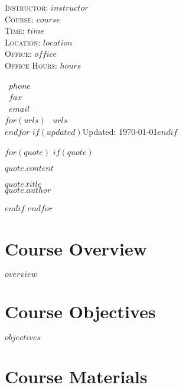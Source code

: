 \documentclass[$fontsize$, letterpaper]{article}
\begin{document}

\begin{minipage}[t]{2.95in}
 \flushleft \footnotesize \textsc{Instructor:} $instructor$\\ \textsc{Course:}
 $course$\\ \textsc{Time:} $time$\\ \textsc{Location:} $location$\\
 \textsc{Office:} $office$\\ \textsc{Office Hours:} $hours$
\end{minipage}
\hfill
\hfill
\begin{minipage}[t]{1.7in}
  \flushright \footnotesize {} ~$phone$\\ \Faxmachine ~$fax$\\  ~$email$\\ $for(urls)$  ~$urls$\\ $endfor$
  $if(updated)$Updated: \today$endif$
\end{minipage}

\bigskip


$for(quote)$
$if(quote)$
\bigskip
\epigraph{$quote.content$}{$quote.title$\\\textsc{$quote.author$}}
\smallskip
$endif$
$endfor$

\section*{Course Overview}

$overview$

\section*{Course Objectives}

$objectives$

\section*{Course Materials}
\end{document}
